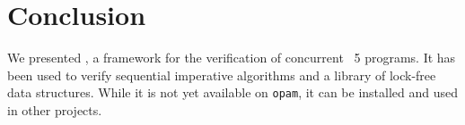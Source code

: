 \section{Conclusion}

We presented \Zoo, a framework for the verification of concurrent \OCaml~5 programs.
It has been used to verify sequential imperative algorithms and a library of lock-free data structures.
While it is not yet available on \texttt{opam}, it can be installed and used in other \Rocq projects.
